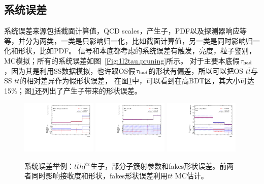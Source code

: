 \subsection{系统误差}\label{sec:1l2tau_sys}
\ltwotau 系统误差来源包括截面计算值，QCD scales，产生子，PDF以及探测器响应等等，并分为两类，一类是只影响归一化，比如截面计算值，另一类是同时影响归一化和形状，比如PDF。
信号和本底都考虑的系统误差有触发，亮度，粒子鉴别，MC模拟；所有的系统误差如图~\ref{Fig:1l2tau.pruning}所示。
对于主要本底假$\tau_{\text{had}}$，因为其是利用SS数据模拟，也许跟OS假$\tau_{\text{had}}$的形状有偏差，所以可以把OS $t\bar{t}$与SS $t\bar{t}$的相对差异作为假\tauhad 形状误差，
在图\ref{Fig:1l2tau.shapesys}中，可以看到在高BDT区，其大小可达15\%；图\ref{Fig:1l2tau.shapesys}还列出了产生子带来的形状误差。
\begin{figure}[htbp]
\centering
\begin{center}
  \includegraphics[width=0.32\textwidth, angle=-90, keepaspectratio]{fig/OneLepTwoTaus/Plots_tth-signal_MCsys.pdf}
  \includegraphics[width=0.32\textwidth, angle=-90, keepaspectratio]{fig/OneLepTwoTaus/Plots_ttV-signal_MCsys.pdf}
  \includegraphics[width=0.32\textwidth, angle=-90, keepaspectratio]{fig/OneLepTwoTaus/h1l2tau_Fakes.pdf}
\end{center}
\caption{系统误差举例：$t\bar{t}h$产生子，部分子簇射参数和fakes形状误差。前两者同时影响接收度和形状，fakes形状误差利用$t\bar{t}$ MC估计。}
\label{Fig:1l2tau.shapesys}
\end{figure}
